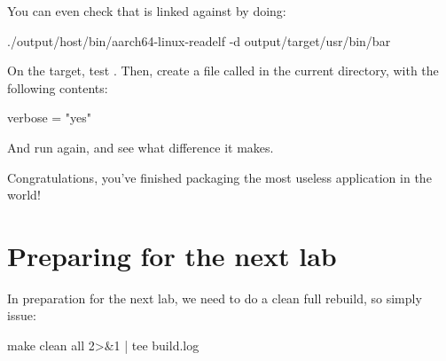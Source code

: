 You can even check that  is linked against
 by doing:

\begin{bashinput}
./output/host/bin/aarch64-linux-readelf -d output/target/usr/bin/bar
\end{bashinput}

On the target, test . Then, create a file called
 in the current directory, with the following contents:

\begin{fileinput}
verbose = "yes"
\end{fileinput}

And run  again, and see what difference it makes.

Congratulations, you've finished packaging the most useless application
in the world!

\section{Preparing for the next lab}

In preparation for the next lab, we need to do a clean full rebuild,
so simply issue:

\begin{bashinput}
make clean all 2>&1 | tee build.log
\end{bashinput}
